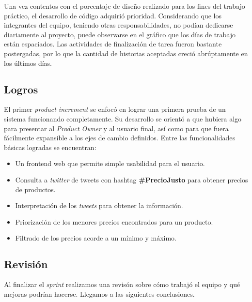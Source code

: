 \documentclass[10pt, a4paper]{article}
\begin{document}
Una vez contentos con el porcentaje de diseño realizado para los fines del trabajo práctico, el desarrollo de código adquirió prioridad. Considerando que los integrantes del equipo, teniendo otras responsabilidades, no podían dedicarse diariamente al proyecto, puede observarse en el gráfico que los días de trabajo están espaciados. Las actividades de finalización de tarea fueron bastante postergadas, por lo que la cantidad de historias aceptadas creció abrúptamente en los últimos días.

\subsection{Logros}

El primer \emph{product increment} se enfocó en lograr una primera prueba de un sistema funcionando completamente. Su desarrollo se orientó a que hubiera algo para presentar al \emph{Product Owner} y al usuario final, así como para que fuera fácilmente expansible a los ejes de cambio definidos. Entre las funcionalidades básicas logradas se encuentran:

\begin{itemize}
  \item Un frontend web que permite simple usabilidad para el usuario.
  \item Consulta a \emph{twitter} de tweets con hashtag \textbf{\#PrecioJusto} para obtener precios de productos.
  \item Interpretación de los \emph{tweets} para obtener la información.
  \item Priorización de los menores precios encontrados para un producto.
  \item Filtrado de los precios acorde a un mínimo y máximo.
\end{itemize}

\subsection{Revisión}

Al finalizar el \emph{sprint} realizamos una revisón sobre cómo trabajó el equipo y qué mejoras podrían hacerse. Llegamos a las siguientes conclusiones. 
\end{document}
